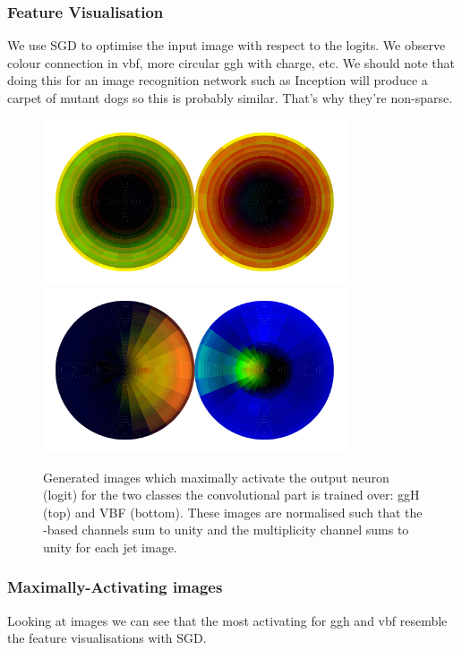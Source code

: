\subsubsection{Feature Visualisation}
We use SGD to optimise the input image with respect to the logits. We observe colour connection in vbf, more circular ggh with charge, etc.
We should note that doing this for an image recognition network such as Inception will produce a carpet of mutant dogs so this is probably similar. That's why they're non-sparse. 
\begin{figure}[h!]
    \includegraphics[width=0.8\textwidth]{figures/event_selection/nonnorm_logits0_v2.pdf}
    \includegraphics[width=0.8\textwidth]{figures/event_selection/nonnorm_logits1_v2.pdf}
    \caption{Generated images which maximally activate the output neuron (logit) for the two classes the convolutional part is trained over: ggH (top) and VBF (bottom).
             These images are normalised such that the \pt-based channels sum to unity and the multiplicity channel sums to unity for each jet image.}
    \label{fig:event_categorisation:mean_jet_image}
\end{figure}

\subsubsection{Maximally-Activating images}
Looking at images we can see that the most activating for ggh and vbf resemble the feature visualisations with SGD. 


